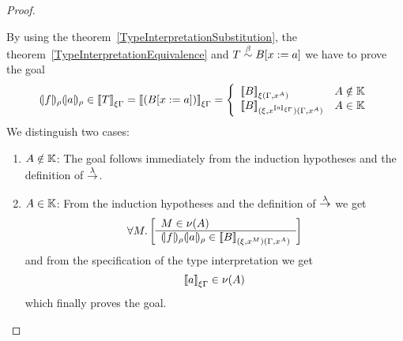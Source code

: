 \begin{theorem}
\begin{proof}
\begin{enumerate}
            By using the theorem~\ref{TypeInterpretationSubstitution}, the
            theorem~\ref{TypeInterpretationEquivalence} and $T
            \stackrel{\beta}{\sim} B[x:=a]$ we have to prove the goal
            $$
            \terminter{f}{\rho}
            \terminter{a}{\rho}
            \in
            \typeinter{T}{\xi\Gamma}
            =
            \typeinter{(B[x:=a])}{\xi\Gamma}
            =
            \left\{
                \begin{array}{ll}
                    \typeinter{B}{\xi(\Gamma,x^A)}
                    &
                    A \notin \Kinds
                    \\
                    \typeinter
                    {B}
                    {(\xi,x^{\typeinter{a}{\xi\Gamma}})(\Gamma,x^A)}
                    &
                    A \in \Kinds
                \end{array}
            \right.
            $$
            We distinguish two cases:
            \begin{enumerate}
            \item $A \notin \mathbb{K}$: The goal follows immediately from the
                induction hypotheses and the definition of $\stackrel{\lambda}{\to}$.

            \item $A \in \mathbb{K}$: From the induction hypotheses and the
                definition of $\stackrel{\lambda}{\to}$ we get
                $$
                    \forall M. \left[ \begin{array}{l} M \in \nu(A) \\ \hline 
                        {(\!|f|\!)_{\rho}}
                        {(\!|a|\!)_{\rho}}
                        \in
                        {{[\![}B{]\!]}}_{(\xi,x^M)(\Gamma,x^A)}
                    \end{array} \right]
                $$
                and from the specification of the type interpretation we get
                $$
                    {{[\![} a{]\!]}}_{\xi\Gamma} \in \nu(A)
                $$
                which finally proves the goal.
            \end{enumerate}
        \end{enumerate}
    \end{proof}
\end{theorem}
